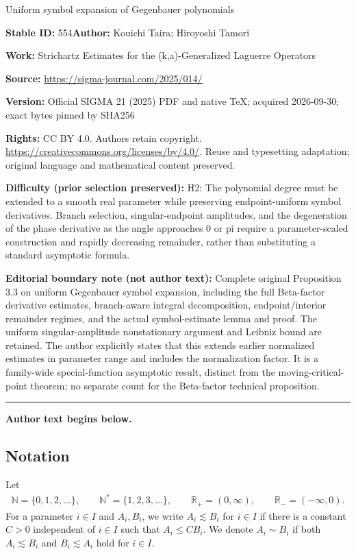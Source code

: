 \documentclass[11pt]{article}
\numberwithin{equation}{section}
\def\R{\mathbb{R}}%
\begin{document}
\begin{center}\Large Uniform symbol expansion of Gegenbauer polynomials\end{center}
\noindent\textbf{Stable ID:} 554\quad\textbf{Author:} Kouichi Taira; Hiroyoshi Tamori\par
\noindent\textbf{Work:} Strichartz Estimates for the (k,a)-Generalized Laguerre Operators\par
\noindent\textbf{Source:} \url{https://sigma-journal.com/2025/014/}\par
\noindent\textbf{Version:} Official SIGMA 21 (2025) PDF and native TeX; acquired 2026-09-30; exact bytes pinned by SHA256\par
\noindent\textbf{Rights:} CC BY 4.0. Authors retain copyright. \url{https://creativecommons.org/licenses/by/4.0/}. Reuse and typesetting adaptation; original language and mathematical content preserved.\par
\noindent\textbf{Difficulty (prior selection preserved):} {\CJKfont H2: The polynomial degree must be extended to a smooth real parameter while preserving endpoint-uniform symbol derivatives. Branch selection, singular-endpoint amplitudes, and the degeneration of the phase derivative as the angle approaches 0 or pi require a parameter-scaled construction and rapidly decreasing remainder, rather than substituting a standard asymptotic formula.}\par
\medskip\noindent\textbf{Editorial boundary note (not author text):} Complete original Proposition 3.3 on uniform Gegenbauer symbol expansion, including the full Beta-factor derivative estimates, branch-aware integral decomposition, endpoint/interior remainder regimes, and the actual symbol-estimate lemma and proof. The uniform singular-amplitude nonstationary argument and Leibniz bound are retained. The author explicitly states that this extends earlier normalized estimates in parameter range and includes the normalization factor. It is a family-wide special-function asymptotic result, distinct from the moving-critical-point theorem; no separate count for the Beta-factor technical proposition.\par
\medskip\hrule\medskip\noindent\textbf{Author text begins below.}\par
\setcounter{section}{1}\setcounter{subsection}{4}
\subsection{Notation}
Let
\begin{align*}
\mathbb{N}=\{0,1,2,\hdots\},\qquad \mathbb{N}^*=\{1,2,3,\hdots\}, \qquad \R_{+}=(0,\infty),\qquad \R_-=(-\infty,0).
\end{align*}
For a parameter $i\in I$ and $A_i,B_i$, we write $A_i\lesssim B_i$ for $i\in I$ if there is a constant $C>0$ independent of $i\in I$ such that $A_i\leq CB_i$. We denote $A_i\sim B_i$ if both $A_i\lesssim B_i$ and $B_i\lesssim A_i$ hold for $i\in I$.
\end{document}
